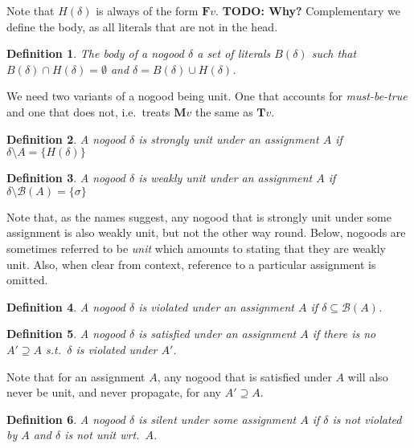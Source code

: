 \documentclass{vutinfth} %
\newcommand{\todo}[1]{{\color{red}\textbf{TODO: {#1}}}} %
\newtheorem{definition}{Definition}[section]
\newcommand{\mbt}{must-be-true\xspace}
\newcommand{\bass}{\mathcal{B}}
\newcommand{\ass}{A}
\newcommand{\bT}{\mathbf{T}}
\newcommand{\bM}{\mathbf{M}}
\newcommand{\bF}{\mathbf{F}}
\newcommand{\headf}{H}
\newcommand{\bodyf}{B}
\newcommand{\bsgl}{\sigma}
\begin{document}
Note that $\headf(\delta)$ is always of the form $\bF v$. \todo{Why?} Complementary we define the body, as all literals that are not in the head.

\begin{definition}
The \emph{body} of a nogood $\delta$ a set of literals $\bodyf(\delta)$ such that $\bodyf(\delta) \cap \headf(\delta) = \emptyset$ and $\delta = \bodyf(\delta) \cup \headf(\delta)$.
\end{definition}

We need two variants of a nogood being unit. One that accounts for \emph{\mbt} and one that does not, i.e.~treats $\bM v$ the same as $\bT v$.

\begin{definition}
A nogood $\delta$ is \emph{strongly unit} under an assignment $\ass$ if $\delta \setminus \ass = \{ \headf(\delta) \}$
\end{definition}

\begin{definition}
A nogood $\delta$ is \emph{weakly unit} under an assignment $\ass$ if $\delta \setminus \bass(\ass) = \{ \bsgl \}$
\end{definition}

Note that, as the names suggest, any nogood that is strongly unit under some assignment is also weakly unit, but not the other way round. Below, nogoods are sometimes referred to be \emph{unit} which amounts to stating that they are weakly unit. Also, when clear from context, reference to a particular assignment is omitted.

\begin{definition}
\label{def:vio}
A nogood $\delta$ is \emph{violated} under an assignment $\ass$ if $\delta \subseteq \bass(\ass)$.
\end{definition}

\begin{definition}
A nogood $\delta$ is \emph{satisfied} under an assignment $\ass$ if there is no $\ass' \supseteq \ass$ s.t.~$\delta$ is violated under $\ass'$.
\end{definition}

Note that for an assignment $\ass$, any nogood that is satisfied under $\ass$ will also never be unit, and never propagate, for any $\ass' \supseteq \ass$.

\begin{definition}
A nogood $\delta$ is \emph{silent} under some assignment $\ass$ if $\delta$ is not violated by $\ass$ and $\delta$ is not unit wrt.~$\ass$.
\end{definition}
\end{document}
